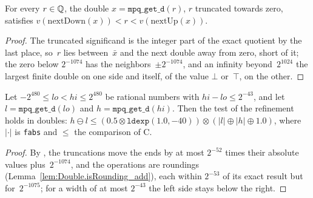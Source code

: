 
\begin{lemma}\label{lem:Double.lt_nextUp_and_nextDown_lt_mpqGetD}
  \leanok
  For every $r \in \mathbb{Q}$, the double $x = \texttt{mpq\_get\_d}(r)$, $r$ truncated towards zero,
  satisfies $v(\mathrm{nextDown}(x)) < r < v(\mathrm{nextUp}(x))$.
\end{lemma}

\begin{proof}
  \leanok
  The truncated significand is the integer part of the exact quotient by the last place, so~$r$
  lies between~$\bar x$ and the next double away from zero, short of it; the zero below $2^{-1074}$
  has the neighbors~$\pm 2^{-1074}$, and an infinity beyond~$2^{1024}$ the largest finite double on
  one side and itself, of the value $\bot$ or~$\top$, on the other.
\end{proof}

\begin{lemma}\label{lem:Double.mpqGetD_sub_mpqGetD_le}
  \leanok
  Let $-2^{480} \le lo < hi \le 2^{480}$ be rational numbers with $hi - lo \le 2^{-43}$, and let
  $l = \texttt{mpq\_get\_d}(lo)$ and $h = \texttt{mpq\_get\_d}(hi)$. Then the test of the refinement
  holds in doubles:
  $h \ominus l \le (0.5 \otimes \texttt{ldexp}(1.0, -40)) \otimes (|l| \oplus |h| \oplus 1.0)$,
  where $|\cdot|$ is \texttt{fabs} and $\le$ the comparison of C.
\end{lemma}

\begin{proof}
  \leanok
  By , the truncations move the
  ends by at most $2^{-52}$ times their absolute values plus~$2^{-1074}$, and the operations are
  roundings (Lemma~\ref{lem:Double.isRounding_add}), each within $2^{-53}$ of its exact result but
  for~$2^{-1075}$; for a width of at most $2^{-43}$ the left side stays below the right.
\end{proof}

